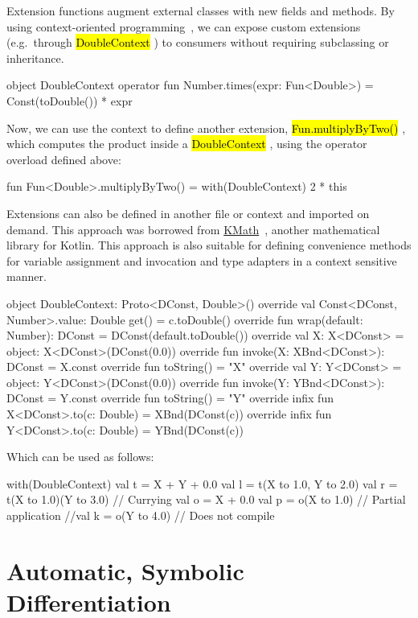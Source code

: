 \documentclass[12pt,initial,twoside,maitrise]{dms}
\newcommand{\inline}[1]{%
\begingroup%
\sethlcolor{slightgray}%
\hl{\ttfamily\small #1}%
\endgroup
}
\numberwithin{equation}{section}
\numberwithin{table}{chapter}
\numberwithin{figure}{chapter}
\begin{document}
Extension functions augment external classes with new fields and methods. By using context-oriented programming~\citep{hirschfeld2008context}, we can expose custom extensions (e.g.\ through \inline{DoubleContext}) to consumers without requiring subclassing or inheritance.
%
\begin{kotlinlisting}[caption={We can provide numerical extensions, wrapped in a context.}]
object DoubleContext {
    operator fun Number.times(expr: Fun<Double>) = Const(toDouble()) * expr
}
\end{kotlinlisting}
%
Now, we can use the context to define another extension, \inline{Fun.multiplyByTwo()}, which computes the product inside a \inline{DoubleContext}, using the operator overload defined above:
%
\begin{kotlinlisting}
fun Fun<Double>.multiplyByTwo() = with(DoubleContext) { 2 * this }
\end{kotlinlisting}
%
Extensions can also be defined in another file or context and imported on demand. This approach was borrowed from \href{https://github.com/mipt-npm/kmath}{KMath}~\citep{nozik2019acat}, another mathematical library for Kotlin. This approach is also suitable for defining convenience methods for variable assignment and invocation and type adapters in a context sensitive manner.
%
\begin{kotlinlisting}
object DoubleContext: Proto<DConst, Double>() {
    override val Const<DConst, Number>.value: Double
        get() = c.toDouble()
    override fun wrap(default: Number): DConst = DConst(default.toDouble())
    override val X: X<DConst> = object: X<DConst>(DConst(0.0)) {
        override fun invoke(X: XBnd<DConst>): DConst = X.const
        override fun toString() = "X"
    }
    override val Y: Y<DConst> = object: Y<DConst>(DConst(0.0)) {
        override fun invoke(Y: YBnd<DConst>): DConst = Y.const
        override fun toString() = "Y"
    }
    override infix fun X<DConst>.to(c: Double) = XBnd(DConst(c))
    override infix fun Y<DConst>.to(c: Double) = YBnd(DConst(c))
}
\end{kotlinlisting}
%
Which can be used as follows:
%
\begin{kotlinlisting}
with(DoubleContext) {
    val t = X + Y + 0.0
    val l = t(X to 1.0, Y to 2.0)
    val r = t(X to 1.0)(Y to 3.0) // Currying
    val o = X + 0.0
    val p = o(X to 1.0) // Partial application
    //val k = o(Y to 4.0) // Does not compile
}
\end{kotlinlisting}

\section{Automatic, Symbolic Differentiation}
\end{document}
